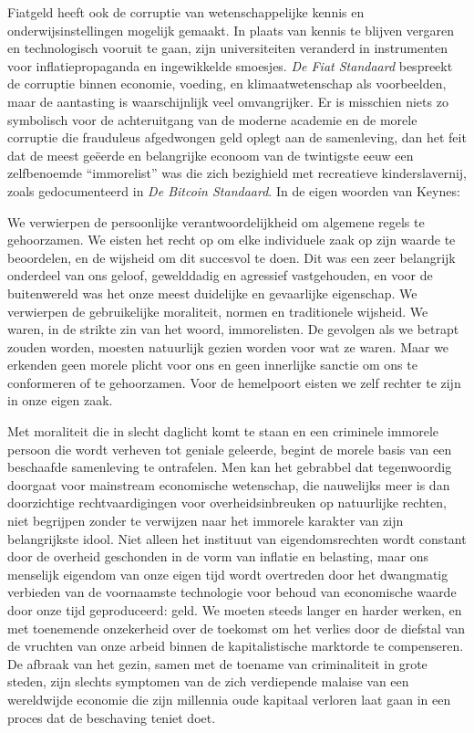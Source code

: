 Fiatgeld heeft ook de corruptie van wetenschappelijke kennis en onderwijsinstellingen mogelijk gemaakt. In plaats van kennis te blijven vergaren en technologisch vooruit te gaan, zijn universiteiten veranderd in instrumenten voor inflatiepropaganda en ingewikkelde smoesjes. \emph{De Fiat Standaard} bespreekt de corruptie binnen economie, voeding, en klimaatwetenschap als voorbeelden, maar de aantasting is waarschijnlijk veel omvangrijker. Er is misschien niets zo symbolisch voor de achteruitgang van de moderne academie en de morele corruptie die frauduleus afgedwongen geld oplegt aan de samenleving, dan het feit dat de meest geëerde en belangrijke econoom van de twintigste eeuw een zelfbenoemde ``immorelist'' was die zich bezighield met recreatieve kinderslavernij, zoals gedocumenteerd in \emph{De Bitcoin Standaard}. In de eigen woorden van Keynes:

\begin{blockquotebox}
    We verwierpen de persoonlijke verantwoordelijkheid om algemene regels te gehoorzamen. We eisten het recht op om elke individuele zaak op zijn waarde te beoordelen, en de wijsheid om dit succesvol te doen. Dit was een zeer belangrijk onderdeel van ons geloof, gewelddadig en agressief vastgehouden, en voor de buitenwereld was het onze meest duidelijke en gevaarlijke eigenschap. We verwierpen de gebruikelijke moraliteit, normen en traditionele wijsheid. We waren, in de strikte zin van het woord, immorelisten. De gevolgen als we betrapt zouden worden, moesten natuurlijk gezien worden voor wat ze waren. Maar we erkenden geen morele plicht voor ons en geen innerlijke sanctie om ons te conformeren of te gehoorzamen. Voor de hemelpoort eisten we zelf rechter te zijn in onze eigen zaak.\footnotemark
\end{blockquotebox}

Met moraliteit die in slecht daglicht komt te staan en een criminele immorele persoon die wordt verheven tot geniale geleerde, begint de morele basis van een beschaafde samenleving te ontrafelen. Men kan het gebrabbel dat tegenwoordig doorgaat voor mainstream economische wetenschap, die nauwelijks meer is dan doorzichtige rechtvaardigingen voor overheidsinbreuken op natuurlijke rechten, niet begrijpen zonder te verwijzen naar het immorele karakter van zijn belangrijkste idool. Niet alleen het instituut van eigendomsrechten wordt constant door de overheid geschonden in de vorm van inflatie en belasting, maar ons menselijk eigendom van onze eigen tijd wordt overtreden door het dwangmatig verbieden van de voornaamste technologie voor behoud van economische waarde door onze tijd geproduceerd: geld. We moeten steeds langer en harder werken, en met toenemende onzekerheid over de toekomst om het verlies door de diefstal van de vruchten van onze arbeid binnen de kapitalistische marktorde te compenseren. De afbraak van het gezin, samen met de toename van criminaliteit in grote steden, zijn slechts symptomen van de zich verdiepende malaise van een wereldwijde economie die zijn millennia oude kapitaal verloren laat gaan in een proces dat de beschaving teniet doet.

